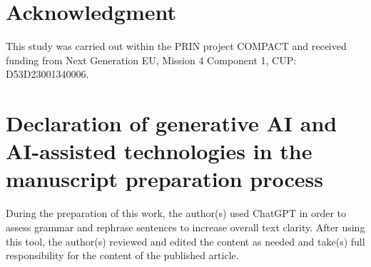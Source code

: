 \documentclass[preprint,12pt]{elsarticle}
\begin{document}













\section*{Acknowledgment}
This study was carried out within the PRIN project COMPACT and received funding from Next Generation EU, Mission 4 Component 1, CUP: D53D23001340006.


\section*{Declaration of generative AI and AI-assisted technologies in the manuscript preparation process}

During the preparation of this work, the author(s) used ChatGPT in order to assess grammar and rephrase sentences to increase overall text clarity. After using this tool, the author(s) reviewed and edited the content as needed and take(s) full responsibility for the content of the published article.






   
 
\end{document}
